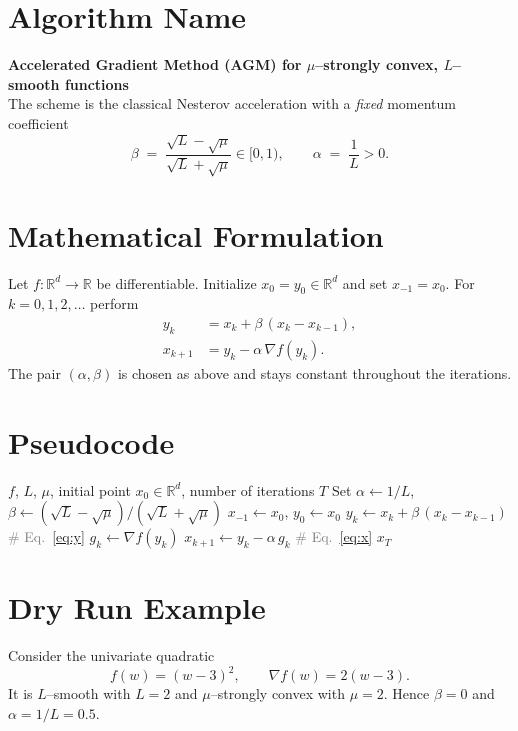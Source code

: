 \documentclass{article}
\newcommand{\R}{\mathbb{R}}
\begin{document}
\section*{Algorithm Name}
\textbf{Accelerated Gradient Method (AGM) for $\mu$–strongly convex, $L$–smooth functions}\\
The scheme is the classical Nesterov acceleration with a \emph{fixed} momentum coefficient
\[
\beta \;=\;\frac{\sqrt{L}-\sqrt{\mu}}{\sqrt{L}+\sqrt{\mu}}\in[0,1),
\qquad 
\alpha \;=\;\frac{1}{L}>0 .
\]

\section*{Mathematical Formulation}
Let $f:\R^{d}\rightarrow\R$ be differentiable.  
Initialize $x_{0}=y_{0}\in\R^{d}$ and set $x_{-1}=x_{0}$.  
For $k=0,1,2,\dots$ perform
\begin{align}
y_{k} &= x_{k}+ \beta\,(x_{k}-x_{k-1}), \label{eq:y}\\[4pt]
x_{k+1} &= y_{k} - \alpha \,\nabla f(y_{k}). \label{eq:x}
\end{align}
The pair $(\alpha,\beta)$ is chosen as above and stays constant throughout the iterations.

\section*{Pseudocode}
\begin{algorithm}[H]
\caption{Accelerated Gradient Method (AGM)}
\begin{algorithmic}[1]
\REQUIRE $f$, $L$, $\mu$, initial point $x_{0}\in\R^{d}$, number of iterations $T$  
\STATE Set $\alpha \gets 1/L$, $\beta \gets (\sqrt{L}-\sqrt{\mu})/(\sqrt{L}+\sqrt{\mu})$  
\STATE $x_{-1}\gets x_{0}$, $y_{0}\gets x_{0}$  
    \STATE $y_{k}\gets x_{k}+ \beta\,(x_{k}-x_{k-1})$ \hfill\textcolor{gray}{\# Eq.~\eqref{eq:y}}
    \STATE $g_{k}\gets \nabla f(y_{k})$
    \STATE $x_{k+1}\gets y_{k} - \alpha\, g_{k}$ \hfill\textcolor{gray}{\# Eq.~\eqref{eq:x}}
\ENDFOR
\RETURN $x_{T}$
\end{algorithmic}
\end{algorithm}

\section*{Dry Run Example}
Consider the univariate quadratic
\[
f(w)= (w-3)^{2},\qquad \nabla f(w)=2(w-3).
\]
It is $L$–smooth with $L=2$ and $\mu$–strongly convex with $\mu=2$.  
Hence $\beta=0$ and $\alpha=1/L=0.5$.
\end{document}
